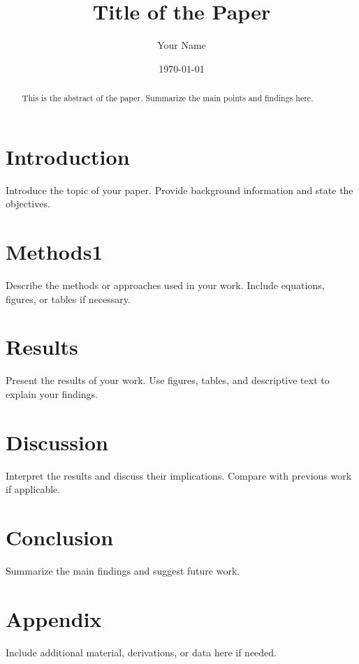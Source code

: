 \documentclass[a4paper,12pt]{article}
\title{Title of the Paper}
\author{Your Name}
\date{\today}
\begin{document}
\maketitle

\begin{abstract}
This is the abstract of the paper. Summarize the main points and findings here.
\end{abstract}

\section{Introduction}
Introduce the topic of your paper. Provide background information and state the objectives.

\section{Methods1}



\huso
Describe the methods or approaches used in your work. Include equations, figures, or tables if necessary.

\section{Results}
Present the results of your work. Use figures, tables, and descriptive text to explain your findings.

\section{Discussion}
Interpret the results and discuss their implications. Compare with previous work if applicable.

\section{Conclusion}
Summarize the main findings and suggest future work.

\appendix
\section{Appendix}
Include additional material, derivations, or data here if needed.



\end{document}
